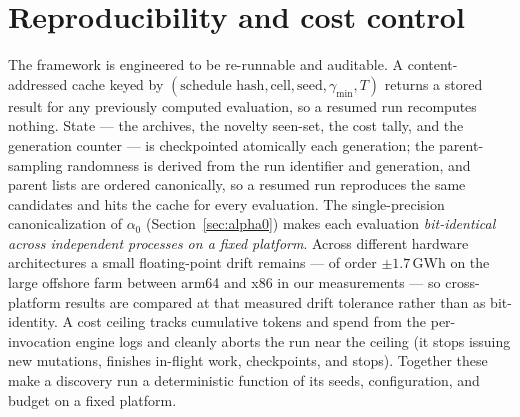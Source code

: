 \documentclass[11pt]{article}
\newcommand{\gm}{\gamma_{\min}}
\begin{document}
\section{Reproducibility and cost control}
\label{sec:repro}
The framework is engineered to be re-runnable and auditable. A content-addressed cache
keyed by $(\text{schedule hash},\text{cell},\text{seed},\gm,T)$ returns a stored result
for any previously computed evaluation, so a resumed run recomputes nothing. State ---
the archives, the novelty seen-set, the cost tally, and the generation counter --- is
checkpointed atomically each generation; the parent-sampling randomness is derived from
the run identifier and generation, and parent lists are ordered canonically, so a
resumed run reproduces the same candidates and hits the cache for every evaluation. The
single-precision canonicalization of $\alpha_0$ (Section~\ref{sec:alpha0}) makes each
evaluation \emph{bit-identical across independent processes on a fixed platform}. Across
different hardware architectures a small floating-point drift remains --- of order
$\pm1.7$\,GWh on the large offshore farm between arm64 and x86 in our measurements ---
so cross-platform results are compared at that measured drift tolerance rather than as
bit-identity. A cost ceiling tracks cumulative tokens and spend from the per-invocation
engine logs and cleanly aborts the run near the ceiling (it stops issuing new mutations,
finishes in-flight work, checkpoints, and stops). Together these make a discovery run a
deterministic function of its seeds, configuration, and budget on a fixed platform.
\end{document}
